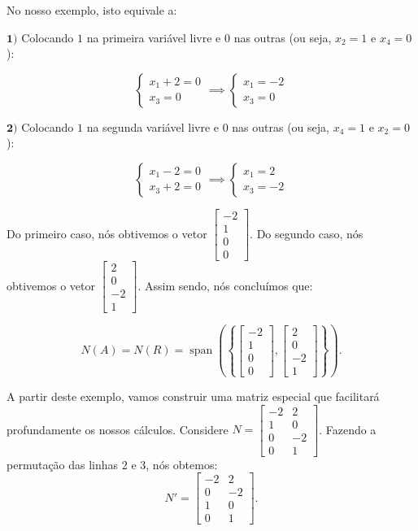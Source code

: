 No nosso exemplo, isto equivale a:

$\mathbf{1)}$ Colocando $1$ na primeira variável livre e $0$ nas outras (ou seja, $x_2 = 1$ e $x_4 = 0$):

$$
\begin{cases}
	x_1 + 2 = 0 \\
	x_3 = 0
\end{cases}
\implies
\begin{cases}
	x_1 = -2 \\
	x_3 = 0
\end{cases}
$$

$\mathbf{2)}$  Colocando $1$ na segunda variável livre e $0$ nas outras (ou seja, $x_4 = 1$ e $x_2 = 0$):

$$
\begin{cases}
	x_1 - 2 = 0 \\
	x_3 + 2 = 0
\end{cases}
\implies
\begin{cases}
	x_1 = 2 \\
	x_3 = -2
\end{cases}
$$

Do primeiro caso, nós obtivemos o vetor $\begin{bmatrix}
	-2 \\
	1 \\
	0 \\
	0
\end{bmatrix}$. Do segundo caso, nós obtivemos o vetor $\begin{bmatrix}
	2 \\
	0 \\
	-2 \\
	1
\end{bmatrix}$. Assim sendo, nós concluímos que:

$$
N(A) = N(R) = \operatorname{span}\left(\left\{\begin{bmatrix}
	-2 \\
	1 \\
	0 \\
	0
\end{bmatrix}, \begin{bmatrix}
2 \\
0 \\
-2 \\
1
\end{bmatrix}\right\}\right).
$$

A partir deste exemplo, vamos construir uma matriz especial que facilitará profundamente os nossos cálculos. Considere $N = \begin{bmatrix}
	-2 & 2 \\
	1 & 0 \\
	0 & -2 \\
	0 & 1
\end{bmatrix}$. Fazendo a permutação das linhas $2$ e $3$, nós obtemos:
$$
N' = \begin{bmatrix}
	-2 & 2 \\
	0 & -2 \\
	1 & 0 \\
	0 & 1
\end{bmatrix}.
$$

